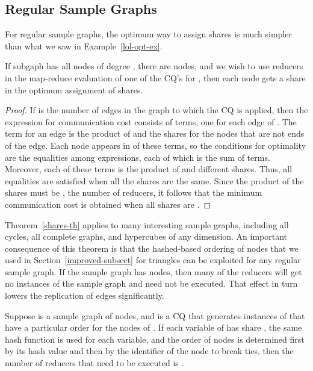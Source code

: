 \subsection{Regular Sample Graphs}
\label{eq-deg-subsect}

For regular sample graphs, the optimum way to assign shares is much simpler than what we saw in Example~\ref{lol-opt-ex}.

\begin{theorem}
\label{shares-th}
If subgaph  has all nodes of degree , there are  nodes, and we wish to use  reducers in the map-reduce evaluation of one of the CQ's for , then each node gets a share  in the optimum assignment of shares.
\end{theorem}

\begin{proof}
If  is the number of edges in the graph to which the CQ is applied, then the expression for communication cost consists of  terms, one for each edge of .  The term for an edge is the product of  and the shares for the  nodes that are not ends of the edge.
Each node appears in  of these terms, so the conditions for optimality are the equalities among  expressions, each of which is the sum of  terms.  Moreover, each of these terms is the product of  and  different shares.
Thus, all equalities are satisfied when all the shares are the same.
Since the product of the shares must be , the number of reducers, it follows that the minimum communication cost is obtained when all shares are .
\end{proof}

Theorem~\ref{shares-th} applies to many interesting sample graphs,
including all cycles, all complete graphs, and hypercubes of any dimension.
An important consequence of this theorem is that the hashed-based ordering of nodes that we used in Section~\ref{improved-subsect} for triangles can be exploited for any regular sample graph.
If the sample graph has  nodes, then many of the reducers will get no instances of the sample graph and need not be executed.  That effect in turn lowers the replication of edges significantly.

\begin{theorem}
\label{order-buckets-th}
Suppose  is a sample graph of  nodes, and  is a CQ that generates instances of  that have a particular order for the nodes of .
If each variable of  has share , the same hash function  is used for each variable, and the order of nodes is determined first by its hash value and then by the identifier of the node to break ties, then the number of reducers that need to be executed is .
\end{theorem}

